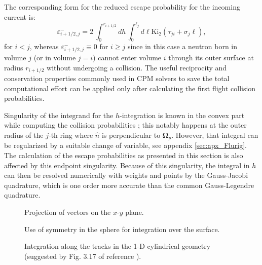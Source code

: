\documentclass{ictt26}
\begin{document}
The corresponding form for the reduced escape probability for the incoming current is:
\begin{equation}
\label{eq:esc_prob_cyij-}
  \varepsilon^-_{i+1/2,j} = 2
    \displaystyle ~\int_0^{r_{i+1/2}} { dh\, %
        \int_0^{\ell_j}{
            d\ell \text{Ki}_2 \left(\tau_{ji} + \sigma_j \ell \right)
        }
	},
\end{equation}
for $i<j$, whereas $\varepsilon^-_{i+1/2,j}\equiv 0$ for $i\geq j$ since in this case a neutron born in volume $j$ (or in volume $j=i$) cannot enter volume $i$ through its outer surface at radius $r_{i+1/2}$ without undergoing a collision. The useful reciprocity and conservation properties commonly used in CPM solvers to save the total computational effort can be applied only after calculating the first flight collision probabilities.

Singularity of the integrand for the $h$-integration is known in the convex part while computing the collision probabilities \cite{hebert2009applied,stamm1983methods}; this notably happens at the outer radius of the $j$-th ring where $\hat{n}$ is perpendicular to $\mathbf{\Omega}_p$. However, that integral can be regularized by a suitable change of variable, see appendix \ref{sec:apx_Flurig}. The calculation of the escape probabilities as presented in this section is %
also affected by this endpoint singularity. Because of this singularity, the integral in $h$ can then be resolved numerically with weights and points by the Gauss-Jacobi quadrature, which is one order more accurate than the common Gauss-Legendre quadrature.

\begin{figure}[htbp]
  \centering
  \begin{minipage}[c]{.5\textwidth}
    \centering
    {%
    
    \caption{Projection of vectors on the $x$-$y$ plane.}
    \label{fig:fullframe}
    }%
    \vspace{3mm}
    \vfill
    {%
    
    \caption{Use of symmetry in the sphere for integration over the surface.}
    \label{fig:sphere_tracks}
    }%
\end{minipage}%
\begin{minipage}{.5\textwidth}
  \centering
    
    \caption{Integration along the tracks in the 1-D cylindrical geometry (suggested by Fig. 3.17 of reference \cite{hebert2009applied}).}
    \label{fig:cyltracks}
\end{minipage}%
\end{figure}
\end{document}

